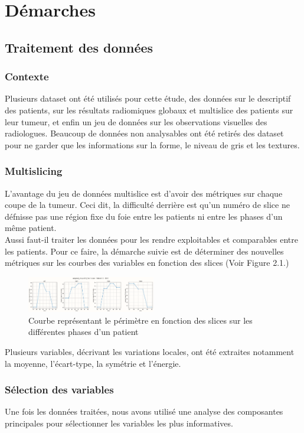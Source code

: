 \chapter{Démarches}
\label{ch:modele_continu}

\section{Traitement des données}
\subsection{Contexte}
Plusieurs dataset ont été utilisés pour cette étude, des données sur le descriptif des patients, sur les résultats radiomiques globaux
et multislice des patients sur leur tumeur, et enfin un jeu de données sur les observations visuelles des radiologues.
Beaucoup de données non analysables ont été retirés des dataset pour ne garder que les informations sur la forme, le niveau de gris et les textures.

\subsection{Multislicing}

L'avantage du jeu de données multislice est d'avoir des métriques sur chaque coupe de la tumeur. 
Ceci dit, la difficulté derrière est qu'un numéro de slice ne défnisse pas une région fixe du foie entre les patients
ni entre les phases d'un même patient.\\
Aussi faut-il traiter les données pour les rendre exploitables et comparables entre les patients. 
Pour ce faire, la démarche suivie est de déterminer des nouvelles métriques sur les courbes des variables en fonction
des slices (Voir Figure 2.1.)
\begin{figure}[H]
    \centering
    \includegraphics[width=0.5\textwidth]{img/perimeter.png}
    \caption{Courbe représentant le périmètre en fonction des slices sur les différentes phases d'un patient}
    \label{fig:perimeter}
\end{figure}

Plusieurs variables, décrivant les variations locales, ont été extraites notamment la moyenne, l'écart-type, 
la symétrie et l'énergie.

\subsection{Sélection des variables}
Une fois les données traitées, nous avons utilisé une analyse des composantes principales pour sélectionner les variables les plus 
informatives. 
